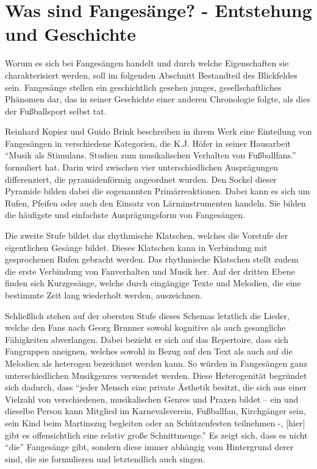 \section{Was sind Fangesänge? - Entstehung und Geschichte}
Worum es sich bei Fangesängen handelt und durch welche Eigenschaften sie charakterisiert werden, soll im folgenden Abschnitt Bestandteil des Blickfeldes sein.
Fangesänge stellen ein geschichtlich gesehen junges, gesellschaftliches Phänomen dar, das in seiner Geschichte einer anderen Chronologie folgte, als dies der Fußballsport selbst tat.

Reinhard Kopiez und Guido Brink beschreiben in ihrem Werk eine Einteilung von Fangesängen in verschiedene Kategorien, die K.J. Höfer in seiner Hausarbeit "`Musik als Stimulans. Studien zum musikalischen Verhalten von Fußballfans."'\cite[S. 15]{RK98} formuliert hat.
Darin wird zwischen vier unterschiedlichen Ausprägungen differenziert, die pyramidenförmig angeordnet wurden.
Den Sockel dieser Pyramide bilden dabei die sogenannten Primärreaktionen.
Dabei kann es sich um Rufen, Pfeifen oder auch den Einsatz von Lärminstrumenten handeln.
Sie bilden die häufigste und einfachste Ausprägungsform von Fangesängen.

Die zweite Stufe bildet das rhythmische Klatschen, welches die Vorstufe der eigentlichen Gesänge bildet.
Dieses Klatschen kann in Verbindung mit gesprochenen Rufen gebracht werden.\cite[S. 196]{AB08}
Das rhythmische Klatschen stellt zudem die erste Verbindung von Fanverhalten und Musik her.
Auf der dritten Ebene finden sich Kurzgesänge, welche durch eingängige Texte und Melodien, die eine bestimmte Zeit lang wiederholt werden, auszeichnen.

Schließlich stehen auf der obersten Stufe dieses Schemas letztlich die Lieder, welche den Fans nach Georg Brunner sowohl kognitive als auch gesangliche Fähigkeiten abverlangen.
Dabei bezieht er sich auf das Repertoire, dass sich Fangruppen aneignen, welches sowohl in Bezug auf den Text als auch auf die Melodien als heterogen bezeichnet werden kann.
So würden in Fangesängen ganz unterschiedlichen Musikgenres verwendet werden.\cite[S. 197]{AB08}
Diese Heterogenität begründet sich dadurch, dass "`jeder Mensch eine private Ästhetik besitzt, die sich aus einer Vielzahl von verschiedenen, musikalischen Genres und Praxen bildet – ein und dieselbe Person kann Mitglied im Karnevalsverein, Fußballfan, Kirchgänger sein, sein Kind beim Martinszug begleiten oder an Schützenfesten teilnehmen -, [hier] gibt es offensichtlich eine relativ große Schnittmenge."'\cite[S. 197]{AB08}
Es zeigt sich, dass es nicht "`die"' Fangesänge gibt, sondern diese immer abhängig vom Hintergrund derer sind, die sie formulieren und letztendlich auch singen.

